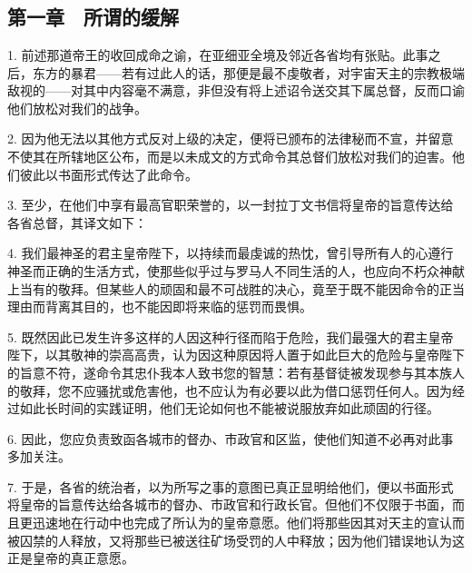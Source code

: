 \section{}


\subsection{第一章　所谓的缓解}

1. 前述那道帝王的收回成命之谕，在亚细亚全境及邻近各省均有张贴。此事之后，东方的暴君——若有过此人的话，那便是最不虔敬者，对宇宙天主的宗教极端敌视的——对其中内容毫不满意，非但没有将上述诏令送交其下属总督，反而口谕他们放松对我们的战争。\par

2. 因为他无法以其他方式反对上级的决定，便将已颁布的法律秘而不宣，并留意不使其在所辖地区公布，而是以未成文的方式命令其总督们放松对我们的迫害。他们彼此以书面形式传达了此命令。\par

3. 至少，在他们中享有最高官职荣誉的，以一封拉丁文书信将皇帝的旨意传达给各省总督，其译文如下：\par

4. 我们最神圣的君主皇帝陛下，以持续而最虔诚的热忱，曾引导所有人的心遵行神圣而正确的生活方式，使那些似乎过与罗马人不同生活的人，也应向不朽众神献上当有的敬拜。但某些人的顽固和最不可战胜的决心，竟至于既不能因命令的正当理由而背离其目的，也不能因即将来临的惩罚而畏惧。\par

5. 既然因此已发生许多这样的人因这种行径而陷于危险，我们最强大的君主皇帝陛下，以其敬神的崇高高贵，认为因这种原因将人置于如此巨大的危险与皇帝陛下的旨意不符，遂命令其忠仆我本人致书您的智慧：若有基督徒被发现参与其本族人的敬拜，您不应骚扰或危害他，也不应认为有必要以此为借口惩罚任何人。因为经过如此长时间的实践证明，他们无论如何也不能被说服放弃如此顽固的行径。\par

6. 因此，您应负责致函各城市的督办、市政官和区监，使他们知道不必再对此事多加关注。\par

7. 于是，各省的统治者，以为所写之事的意图已真正显明给他们，便以书面形式将皇帝的旨意传达给各城市的督办、市政官和行政长官。但他们不仅限于书面，而且更迅速地在行动中也完成了所认为的皇帝意愿。他们将那些因其对天主的宣认而被囚禁的人释放，又将那些已被送往矿场受罚的人中释放；因为他们错误地认为这正是皇帝的真正意愿。\par

